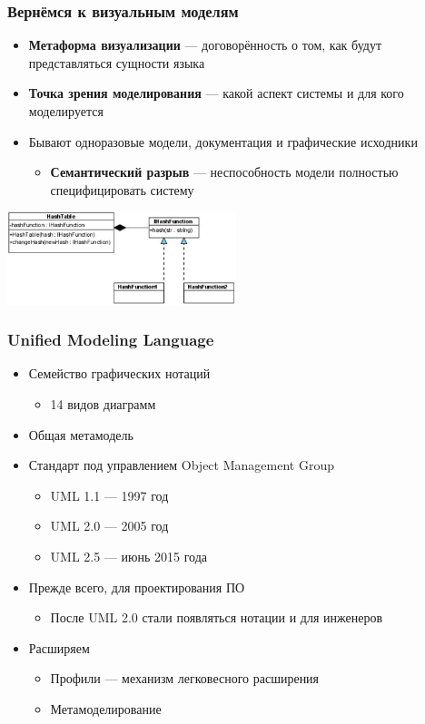 \documentclass[xetex,mathserif,serif]{beamer}
\begin{document}
	\begin{frame}
		\frametitle{Вернёмся к визуальным моделям}
		\begin{itemize}
			\item \textbf{Метаформа визуализации} --- договорённость о том, как будут представляться сущности языка
			\item \textbf{Точка зрения моделирования} --- какой аспект системы и для кого моделируется
			\item Бывают одноразовые модели, документация и графические исходники
			\begin{itemize}
				\item \textbf{Семантический разрыв} --- неспособность модели полностью специфицировать систему
			\end{itemize}
		\end{itemize}
		\begin{center}
			\includegraphics[width=0.5\textwidth]{hashTable.png}
		\end{center}
	\end{frame}

	\begin{frame}
		\frametitle{Unified Modeling Language}
		\begin{itemize}
			\item Семейство графических нотаций
			\begin{itemize}
				\item 14 видов диаграмм
			\end{itemize}
			\item Общая метамодель
			\item Стандарт под управлением Object Management Group
			\begin{itemize}
				\item UML 1.1 --- 1997 год
				\item UML 2.0 --- 2005 год
				\item UML 2.5 --- июнь 2015 года
			\end{itemize}
			\item Прежде всего, для проектирования ПО
			\begin{itemize}
				\item После UML 2.0 стали появляться нотации и для инженеров
			\end{itemize}
			\item Расширяем
			\begin{itemize}
				\item Профили --- механизм легковесного расширения
				\item Метамоделирование
			\end{itemize}
		\end{itemize}
	\end{frame}
\end{document}
